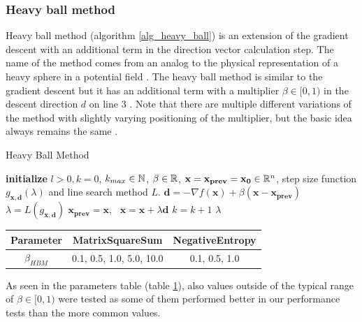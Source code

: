 \documentclass[english, 12pt, a4paper, sci, utf8, a-1b, online, table]{aaltothesis}
\newcommand{\vect}[1]{\ensuremath{\mathbf{#1}}}
\newcommand{\norm}[1]{\ensuremath\Vert #1 \Vert}
\newcommand{\R}{\ensuremath\mathbb{R}}
\newcommand{\N}{\ensuremath\mathbb{N}}
\begin{document}
\subsubsection{Heavy ball method}


Heavy ball method (algorithm \ref{alg_heavy_ball}) is an extension of the gradient descent with an additional term in the direction vector calculation step. The name of the method comes from an analog to the physical representation of a heavy sphere in a potential field \cite{book:heavy_ball_origin}. The heavy ball method is similar to the gradient descent but it has an additional term with a multiplier $\beta \in [0, 1)$ in the descent direction $d$ on line 3 \cite{ghadimi2014global}. Note that there are multiple different variations of the method with slightly varying positioning of the multiplier, but the basic idea always remains the same \cite{ghadimi2014global} \cite{book:heavy_ball_origin}.

\begin{algorithm}[H]
\caption{Heavy Ball Method}
\label{alg_heavy_ball}
\begin{algorithmic}[1]
\STATE \textbf{initialize} $l > 0, k = 0$, $k_{max} \in \N$, $\beta \in \R$, $\vect{x} = \vect{x_{prev}} = \vect{x_0} \in \R^n$, step size function $g_{\vect{x}, \vect{d}}(\lambda)$ and line search method $L$.
\WHILE{$\norm{\nabla f(\vect{x})} > l$ \AND $k < k_{max}$}
    \STATE $\vect{d} = -\nabla f(\vect{x}) + \beta (\vect{x} - \vect{x_{prev}})$
    \STATE $\lambda = L(g_{\vect{x}, \vect{d}})$
    \STATE $\vect{x_{prev}} = \vect{x}$, \ $\vect{x} = \vect{x} + \lambda \vect{d}$
    \STATE $k = k + 1$
\ENDWHILE
\RETURN $\lambda$
\end{algorithmic}
\end{algorithm}

\begin{table}[H]
\label{tab:params_HeavyBallMethod}
\centering
{}
\begin{tabular}{|c|c|c|}
\hline
\rowcolor{gray!25}
Parameter & MatrixSquareSum & NegativeEntropy \\
\hline
$\beta_{HBM}$ & 0.1, 0.5, 1.0, 5.0, 10.0 & 0.1, 0.5, 1.0 \\
\hline
\end{tabular}
\end{table}

As seen in the parameters table (table \ref{tab:params_HeavyBallMethod}), also values outside of the typical range of $\beta \in [0, 1)$ were tested as some of them performed better in our performance tests than the more common values.
\end{document}

